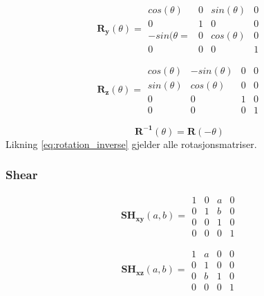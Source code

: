 \begin{equation}
    \boldsymbol{R_y}(\theta) =
    \begin{matrix}
        cos(\theta) & 0 & sin(\theta) & 0 \\
        0 & 1 & 0 & 0 \\
        -sin(\theta= & 0 & cos(\theta) & 0 \\
        0 & 0 & 0 & 1
    \end{matrix}
\end{equation}

\begin{equation}
    \boldsymbol{R_z}(\theta) =
    \begin{matrix}
        cos(\theta) & -sin(\theta) & 0 & 0 \\
        sin(\theta) & cos(\theta) & 0 & 0 \\
        0 & 0 & 1 & 0 \\
        0 & 0 & 0 & 1
    \end{matrix}
\end{equation}

\begin{equation} \label{eq:rotation_inverse}
    \boldsymbol{R^{-1}}(\theta) = \boldsymbol{R}(-\theta)
\end{equation}    
Likning \ref{eq:rotation_inverse} gjelder alle rotasjonsmatriser.

\subsubsection{Shear}
\begin{equation}
    \boldsymbol{SH_{xy}}(a,b) =
    \begin{matrix}
        1 & 0 & a & 0\\
        0 & 1 & b & 0\\
        0 & 0 & 1 & 0\\
        0 & 0 & 0 & 1
    \end{matrix}
\end{equation}

\begin{equation}
    \boldsymbol{SH_{xz}}(a,b) =
    \begin{matrix}
        1 & a & 0 & 0\\
        0 & 1 & 0 & 0\\
        0 & b & 1 & 0\\
        0 & 0 & 0 & 1
    \end{matrix}
\end{equation}

